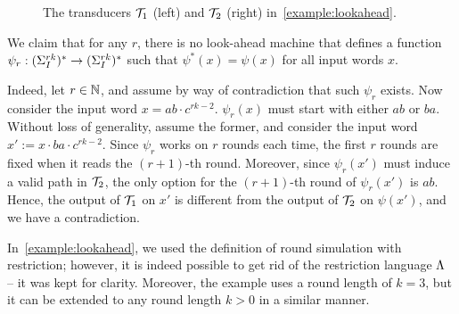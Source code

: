 \begin{example}
\begin{figure}[ht]
	\caption{The transducers $\mathcal{T}_1$ (left) and $\mathcal{T}_2$ (right) in~\cref{example:lookahead}.}
	\label{fig:example_lookahead}
\end{figure}

We claim that for any $r$, there is no look-ahead machine that defines a function $\psi_r: (\Sigma_{I}^{rk})^* \rightarrow (\Sigma_{I}^{rk})^*$ such that $\psi^*(x)=\psi(x)$ for all input words $x$.

Indeed, let $r\in\mathbb{N}$, and assume by way of contradiction that such $\psi_r$ exists. Now consider the input word $x=ab\cdot c^{rk-2}$. $\psi_r(x)$ must start with either $ab$ or $ba$. Without loss of generality, assume the former, and consider the input word $x':=x\cdot ba\cdot c^{rk-2}$. Since $\psi_r$ works on $r$ rounds each time, the first $r$ rounds are fixed when it reads the $(r+1)$-th round. Moreover, since $\psi_r(x')$ must induce a valid path in $\mathcal{T}_2$, the only option for the $(r+1)$-th round of $\psi_r(x')$ is $ab$. Hence, the output of $\mathcal{T}_1$ on $x'$ is different from the output of $\mathcal{T}_2$ on $\psi(x')$, and we have a contradiction.
\end{example}



In~\cref{example:lookahead}, we used the definition of round simulation with restriction; however, it is indeed possible to get rid of the restriction language $\Lambda$ -- it was kept for clarity. Moreover, the example uses a round length of $k=3$, but it can be extended to any round length $k>0$ in a similar manner.

